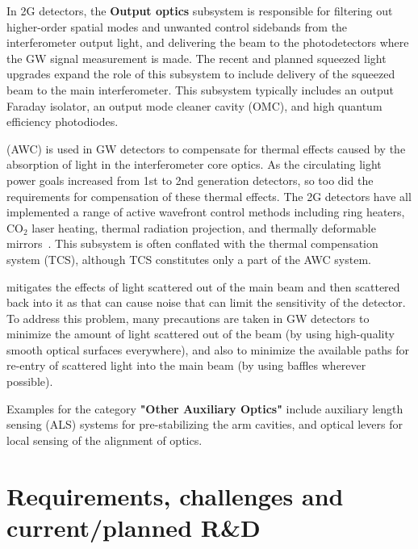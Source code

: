 \noindent
In 2G detectors, the {\bf Output optics} subsystem is responsible for filtering out higher-order spatial modes and unwanted control sidebands from the interferometer output light, and delivering the beam to the photodetectors where the GW signal measurement is made. The recent and planned squeezed light upgrades expand the role of this subsystem to include delivery of the squeezed beam to the main interferometer. This subsystem typically includes an output Faraday isolator, an output mode cleaner cavity (OMC), and high quantum efficiency photodiodes.

 (AWC) is used in GW detectors to compensate for thermal effects caused by the absorption of light in the interferometer core optics. As the circulating light power goals increased from 1st to 2nd generation detectors, so too did the requirements for compensation of these thermal effects. The 2G detectors have all implemented a range of active wavefront control methods including ring heaters, CO$_2$ laser heating, thermal radiation projection, and thermally deformable mirrors~\cite{aLIGO_AWC, AdVirgo_IO}. This subsystem is often conflated with the thermal compensation system (TCS), although TCS constitutes only a part of the AWC system. 

mitigates the effects of light scattered out of the main beam and then scattered back into it as that can cause noise that can limit the sensitivity of the detector.
To address this problem, many precautions are taken in GW detectors to minimize the amount of light scattered out of the beam (by using high-quality smooth optical surfaces everywhere), and also to minimize the available paths for re-entry of scattered light into the main beam (by using baffles wherever possible). 

\noindent 
Examples for the category {\bf "Other Auxiliary Optics"} include auxiliary length sensing (ALS) systems for pre-stabilizing the arm cavities, and optical levers for local sensing of the alignment of optics.

\section{Requirements, challenges and current/planned R\&D}

